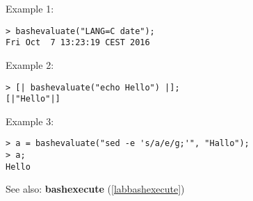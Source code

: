 \noindent Example 1: 
\begin{center}\begin{minipage}{15cm}\begin{Verbatim}[frame=single]
> bashevaluate("LANG=C date");
Fri Oct  7 13:23:19 CEST 2016
\end{Verbatim}
\end{minipage}\end{center}
\noindent Example 2: 
\begin{center}\begin{minipage}{15cm}\begin{Verbatim}[frame=single]
> [| bashevaluate("echo Hello") |];
[|"Hello"|]
\end{Verbatim}
\end{minipage}\end{center}
\noindent Example 3: 
\begin{center}\begin{minipage}{15cm}\begin{Verbatim}[frame=single]
> a = bashevaluate("sed -e 's/a/e/g;'", "Hallo");
> a;
Hello
\end{Verbatim}
\end{minipage}\end{center}
See also: \textbf{bashexecute} (\ref{labbashexecute})
